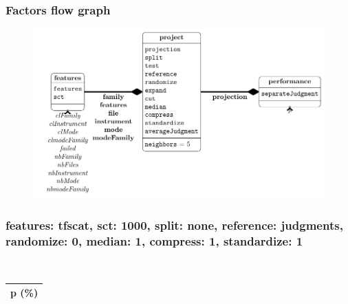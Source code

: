   
 
  
  
\begin{frame}\frametitle{Factors flow graph} 
  
  
\begin{center} 
  
  
\begin{figure} 
  
  
\includegraphics[width=\textwidth,height=0.8\textheight,keepaspectratio]{../figures/factors.pdf} 
  
  
\label{factorFlowGraph} 
  
  
\end{figure} 
  
  
\end{center} 
  
  
\end{frame} 
  
\begin{frame}\frametitle{features: tfscat, sct: 1000, split: none, reference: judgments, randomize: 0, median: 1, compress: 1, standardize: 1} 
  
\begin{table} 
\begin{center} 
\ 
 \setlength{\tabcolsep}{.16667em} 
\begin{tabular}{c} 
p (\%) \\ 
\hline 
\end{tabular} 
\end{center} 
\label{fetfSc1000SpnoRejuRa0Me1Co1St1} 
\end{table} 
 
\end{frame}  
